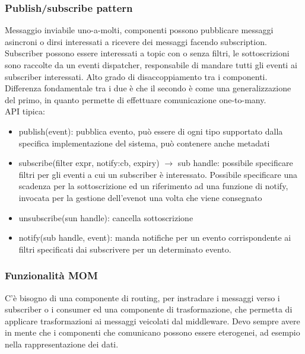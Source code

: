 \documentclass{article}
\begin{document}
\subsubsection{Publish/subscribe pattern}
Messaggio inviabile uno-a-molti, componenti possono pubblicare messaggi asincroni o dirsi interessati a ricevere dei messaggi facendo subscription.\\ Subscriber possono essere interessati a topic con o senza filtri, le sottoscrizioni sono raccolte da un eventi dispatcher, responsabile di mandare tutti gli eventi ai subscriber interessati. Alto grado di disaccoppiamento tra i componenti. Differenza fondamentale tra i due è che il secondo è come una generalizzazione del primo, in quanto permette di effettuare comunicazione one-to-many.\\ API tipica:
\begin{itemize}
\item publish(event): pubblica evento, può essere di ogni tipo supportato dalla specifica implementazione del sistema, può contenere anche metadati
\item subscribe(filter expr, notify:cb, expiry) $\rightarrow$ sub handle: possibile specificare filtri per gli eventi a cui un subscriber è interessato. Possibile specificare una scadenza per la sottoscrizione ed un riferimento ad una funzione di notify, invocata per la gestione dell'evenot una volta che viene consegnato
\item unsubscribe(sun handle): cancella sottoscrizione
\item notify(sub handle, event): manda notifiche per un evento corrispondente ai filtri specificati dai subscrivere per un determinato evento. 
\end{itemize}
\subsubsection{Funzionalità MOM}
C'è bisogno di una componente di routing, per instradare i messaggi verso i subscriber o i consumer ed una componente di trasformazione, che permetta di applicare trasformazioni ai messaggi veicolati dal middleware. Devo sempre avere in mente che i componenti che comunicano possono essere eterogenei, ad esempio nella rappresentazione dei dati.
\end{document}
